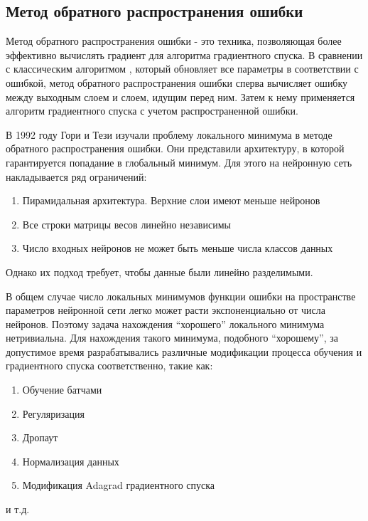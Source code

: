 \subsection{Метод обратного распространения ошибки}
Метод обратного распространения ошибки - это техника, позволяющая более эффективно вычислять градиент для алгоритма градиентного спуска. В сравнении с классическим алгоритмом  , который обновляет все параметры в соответствии с ошибкой, метод обратного распространения ошибки сперва вычисляет ошибку между выходным слоем и слоем, идущим перед ним. Затем к нему применяется алгоритм градиентного спуска с учетом распространенной ошибки.
\par
В 1992 году Гори и Тези\cite{goritesi} изучали проблему локального минимума в методе обратного распространения ошибки. Они представили архитектуру, в которой гарантируется попадание в глобальный минимум. Для этого на нейронную сеть накладывается ряд ограничений:
\begin{enumerate}
	\item Пирамидальная архитектура. Верхние слои имеют меньше нейронов
	\item Все строки матрицы весов линейно независимы
	\item Число входных нейронов не может быть меньше числа классов данных
\end{enumerate}
Однако их подход требует, чтобы данные были линейно разделимыми. 
\par
В общем случае число локальных минимумов функции ошибки на пространстве параметров нейронной сети легко может расти экспоненциально от числа нейронов. Поэтому задача нахождения “хорошего” локального минимума нетривиальна. Для нахождения такого минимума, подобного “хорошему”, за допустимое время разрабатывались различные модификации процесса обучения и градиентного спуска соответственно, такие как:
\begin{enumerate}
	\item Обучение батчами
	\item Регуляризация
	\item Дропаут
	\item Нормализация данных
	\item Модификация Adagrad градиентного спуска
\end{enumerate}
и т.д.
